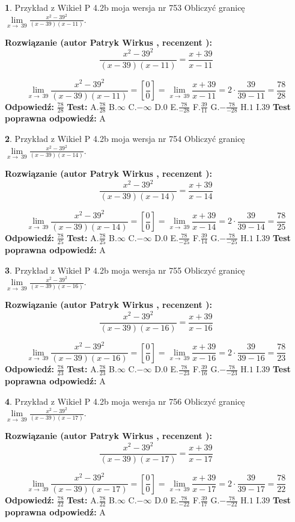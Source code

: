 \documentclass[12pt, a4paper]{article}
\theoremstyle{definition} %
\newtheorem{zad}{}
\newcommand{\zadStart}[1]{\begin{zad}#1\newline}
\newcommand{\zadStop}{\end{zad}}
\newcommand{\rozwStart}[2]{\noindent \textbf{Rozwiązanie (autor #1 , recenzent #2): }\newline}
\newcommand{\rozwStop}{\newline}
\newcommand{\odpStart}{\noindent \textbf{Odpowiedź:}\newline}
\newcommand{\odpStop}{\newline}
\newcommand{\testStart}{\noindent \textbf{Test:}\newline}
\newcommand{\testStop}{\newline}
\newcommand{\kluczStart}{\noindent \textbf{Test poprawna odpowiedź:}\newline}
\newcommand{\kluczStop}{\newline}
\begin{document}
\zadStart{Przykład z Wikieł P 4.2b moja wersja nr 753}
Obliczyć granicę $\lim\limits_{x\to\ 39}\frac{x^{2}-39^{2}}{(x-39)(x-11)}$.
\zadStop
\rozwStart{Patryk Wirkus}{}
$$\frac{x^{2}-39^{2}}{(x-39)(x-11)}=\frac{x+39}{x-11}$$

$$\lim\limits_{x\to\ 39}\frac{x^{2}-39^{2}}{(x-39)(x-11)}=[\frac{0}{0}]=\lim\limits_{x\to\ 39}\frac{x+39}{x-11}=2 \cdot \frac{39}{39-11} = \frac{78}{28}$$
\rozwStop
\odpStart
$\frac{78}{28}$
\odpStop
\testStart
A.$\frac{78}{28}$
B.$\infty$
C.$-\infty$
D.$0$
E.$\frac{78}{-28}$
F.$\frac{39}{11}$
G.$-\frac{78}{-28}$
H.$1$
I.$39$
\testStop
\kluczStart
A
\kluczStop



\zadStart{Przykład z Wikieł P 4.2b moja wersja nr 754}
Obliczyć granicę $\lim\limits_{x\to\ 39}\frac{x^{2}-39^{2}}{(x-39)(x-14)}$.
\zadStop
\rozwStart{Patryk Wirkus}{}
$$\frac{x^{2}-39^{2}}{(x-39)(x-14)}=\frac{x+39}{x-14}$$

$$\lim\limits_{x\to\ 39}\frac{x^{2}-39^{2}}{(x-39)(x-14)}=[\frac{0}{0}]=\lim\limits_{x\to\ 39}\frac{x+39}{x-14}=2 \cdot \frac{39}{39-14} = \frac{78}{25}$$
\rozwStop
\odpStart
$\frac{78}{25}$
\odpStop
\testStart
A.$\frac{78}{25}$
B.$\infty$
C.$-\infty$
D.$0$
E.$\frac{78}{-25}$
F.$\frac{39}{14}$
G.$-\frac{78}{-25}$
H.$1$
I.$39$
\testStop
\kluczStart
A
\kluczStop



\zadStart{Przykład z Wikieł P 4.2b moja wersja nr 755}
Obliczyć granicę $\lim\limits_{x\to\ 39}\frac{x^{2}-39^{2}}{(x-39)(x-16)}$.
\zadStop
\rozwStart{Patryk Wirkus}{}
$$\frac{x^{2}-39^{2}}{(x-39)(x-16)}=\frac{x+39}{x-16}$$

$$\lim\limits_{x\to\ 39}\frac{x^{2}-39^{2}}{(x-39)(x-16)}=[\frac{0}{0}]=\lim\limits_{x\to\ 39}\frac{x+39}{x-16}=2 \cdot \frac{39}{39-16} = \frac{78}{23}$$
\rozwStop
\odpStart
$\frac{78}{23}$
\odpStop
\testStart
A.$\frac{78}{23}$
B.$\infty$
C.$-\infty$
D.$0$
E.$\frac{78}{-23}$
F.$\frac{39}{16}$
G.$-\frac{78}{-23}$
H.$1$
I.$39$
\testStop
\kluczStart
A
\kluczStop



\zadStart{Przykład z Wikieł P 4.2b moja wersja nr 756}
Obliczyć granicę $\lim\limits_{x\to\ 39}\frac{x^{2}-39^{2}}{(x-39)(x-17)}$.
\zadStop
\rozwStart{Patryk Wirkus}{}
$$\frac{x^{2}-39^{2}}{(x-39)(x-17)}=\frac{x+39}{x-17}$$

$$\lim\limits_{x\to\ 39}\frac{x^{2}-39^{2}}{(x-39)(x-17)}=[\frac{0}{0}]=\lim\limits_{x\to\ 39}\frac{x+39}{x-17}=2 \cdot \frac{39}{39-17} = \frac{78}{22}$$
\rozwStop
\odpStart
$\frac{78}{22}$
\odpStop
\testStart
A.$\frac{78}{22}$
B.$\infty$
C.$-\infty$
D.$0$
E.$\frac{78}{-22}$
F.$\frac{39}{17}$
G.$-\frac{78}{-22}$
H.$1$
I.$39$
\testStop
\kluczStart
A
\kluczStop
\end{document}
